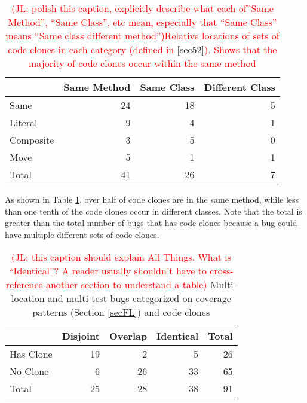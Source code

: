 \documentclass[sigconf, timestamp-false, anonymous=true]{acmart}
\newcommand\todo[1]{\textcolor{red}{#1}}
\begin{document}
\begin{table}
{\begin{center}
\begin{tabular} {lrrr}
\toprule
& Same Method & Same Class & Different Class \\
\hline
Same & 24 & 18 & 5  \\ 
Literal & 9 & 4 & 1  \\
Composite & 3 & 5 & 0  \\
Move & 5 & 1 & 1  \\
\midrule
Total & 41 & 26 & 7 \\
\bottomrule
\end{tabular}
\end{center}
}
\caption{\todo{(JL: polish this caption, explicitly describe what each of''Same
    Method'', ``Same Class'', etc mean, especially that ``Same Class'' means
    ``Same class different method'')Relative locations of sets of code clones in each category (defined in \ref{sec52}).
Shows that the majority of code clones occur within the same method}}
\label{tab:clones_loc}
\end{table}

As shown in Table \ref{tab:clones_loc}, over half of code clones are in the same method, while less than
one tenth of the code clones occur in different classes. Note that the total is greater
than the total number of bugs that has code clones because a bug could have multiple different 
sets of code clones.

\begin{table}
	{\begin{center}
			\begin{tabular} {lrrrr}
				\toprule
				& Disjoint & Overlap & Identical & Total \\
				\midrule
				Has Clone & 19 & 2 & 5 & 26 \\
				No Clone & 6 & 26 & 33 &  65\\
                \midrule
				Total & 25 & 28 & 38 & 91 \\
                \bottomrule
			\end{tabular}
		\end{center}
	}
	\caption{\todo{(JL: this caption should explain All Things. What is
        ``Identical''? A reader usually shouldn't have to cross-reference another
        section to understand a table)} Multi-location and multi-test bugs categorized on coverage patterns (Section 
		\ref{secFL}) and code clones}
	\label{tab:cov_clones}
\end{table}
\end{document}
